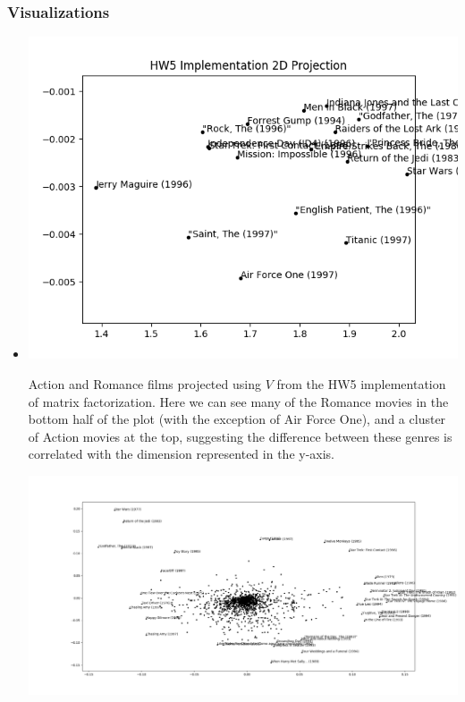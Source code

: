 \subsubsection{Visualizations}
\begin{itemize}
    \item {}

        \includegraphics[scale=.5]{hw5_impl_action_romance.png}

        Action and Romance films projected using $V$ from the HW5 implementation of matrix factorization. Here we can see many of the Romance movies in the bottom half of the plot (with the exception of Air Force One), and a cluster of Action movies at the top, suggesting the difference between these genres is correlated with the dimension represented in the y-axis.

        \includegraphics[width=\textwidth]{off_the_shelf_outliers.png}


\end{itemize}
